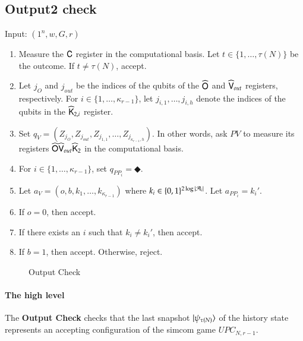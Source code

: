 \subsection{Output2 check}
\label{sec:output_check}


\vspace{10pt}
\begin{center}
\begin{mdframed}
    Input: $(1^n,w,G,r)$
    \begin{enumerate}
		\item Measure the ${\mathsf{C}}$ register in the computational basis. Let $t \in \{1,\ldots,\tau(N)\}$ be the outcome. If $t \neq \tau(N)$, accept.
		
		\item Let $j_O$ and $j_{out}$ be the indices of the qubits of the $\widehat{{\mathsf{O}}}$ and $\widehat{{\mathsf{V}}}_{out}$ registers, respectively. For $i \in \{1,\ldots,\kappa_{r-1}\}$, let $j_{i,1},\ldots,j_{i,h}$ denote the indices of the qubits in the $\widehat{{\mathsf{K}}}_{2,i}$ register. 
		\item Set $q_V = (Z_{j_O},Z_{j_{out}},Z_{j_{1,1}},\ldots,Z_{j_{\kappa_{r-1},h}})$. In other words, ask $PV$ to measure its registers $\widehat{{\mathsf{O}}} \widehat{{\mathsf{V}}}_{out} \widehat{{\mathsf{K}}}_2$ in the computational basis. 
		\item For $i \in \{1,\ldots,\kappa_{r-1}\}$, set $q_{PP_i} = \Diamondblack$. 
		\item Let $a_V = (o,b,k_1,\ldots,k_{\kappa_{r-1}})$ where $k_i \in \{0,1\}^{2\log |\mathcal A_i|}$. Let $a_{PP_i} = k_i'$. 
		\item If $o = 0$, then accept.
		\item If there exists an $i$ such that $k_i \neq k_i'$, then accept.
		\item If $b = 1$, then accept. Otherwise, reject. 
	\end{enumerate}    
\end{mdframed}
\end{center}
\begin{figure}[H]
\caption{Output Check}
\label{fig:output_check}
\end{figure}


\paragraph{The high level} The \textbf{Output Check} checks that the last snapshot $|\psi_{\tau(N)}\rangle$ of the history state represents an accepting configuration of the simcom game $UPC_{N,r-1}$. 

